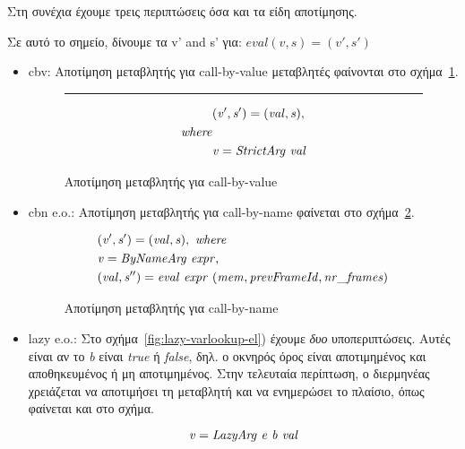 \documentclass[diploma]{softlab-thesis}
\begin{document}
Στη συνέχια έχουμε τρεις περιπτώσεις όσα και τα είδη αποτίμησης.

Σε αυτό το σημείο, δίνουμε τα v' and s' για:
  $ \mathit{eval (v, s) = (v', s')} $

  \begin{itemize}
    \item cbv: Αποτίμηση μεταβλητής για call-by-value 
          μεταβλητές φαίνονται στο σχήμα~\ref{fig:cbv-varLookup-el}.
      \begin{figure}[t]
      \hrule
        \begin{align*}
           & \mathit{(v', s') = (val, s),} \\
           \mathit{where} \\ 
           & \mathit{v = StrictArg \hfill\ val}
        \end{align*}
      \caption{Αποτίμηση μεταβλητής για call-by-value\label{fig:cbv-varLookup-el}}
      \end{figure}
    \item cbn e.o.: Αποτίμηση μεταβλητής για call-by-name
    φαίνεται στο σχήμα~\ref{fig:cbn-varLookup-el}.

    \begin{figure}[t]
      \begin{align*}
        & \mathit{ (v', s') = (val, s), \hfill\ where } \\
        & \mathit{ v = ByNameArg \hfill\ expr, } \\
        & \mathit{(val, s'') = eval \hfill\ expr \hfill\ (mem, prevFrameId, nr\_frames)} \\
      \end{align*}
    \caption{Αποτίμηση μεταβλητής για call-by-name\label{fig:cbn-varLookup-el}}
    \end{figure}      

    \item lazy e.o.: Στο σχήμα~\ref{fig:lazy-varlookup-el}) έχουμε \textit{δυο} υποπεριπτώσεις.
    Αυτές είναι αν το \textit{b} είναι \textit{true} ή \textit{false}, δηλ. ο οκνηρός όρος είναι αποτιμημένος και αποθηκευμένος
    ή μη αποτιμημένος. Στην τελευταία περίπτωση, ο διερμηνέας χρειάζεται να αποτιμήσει τη μεταβλητή και να ενημερώσει το πλαίσιο, όπως φαίνεται και στο σχήμα.

    \begin{figure}[t]
      \[\mathit{v = LazyArg \hfill\ e \hfill\ b \hfill\ val}\]
      

\end{figure}
\end{itemize}
\end{document}
